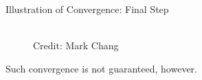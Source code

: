 \begin{frame} {Illustration of Convergence: Final Step}
  \begin{figure}
    \centering
      \tiny{\\Credit: Mark Chang}
  \end{figure}
  Such convergence is not guaranteed, however.
\end{frame}


